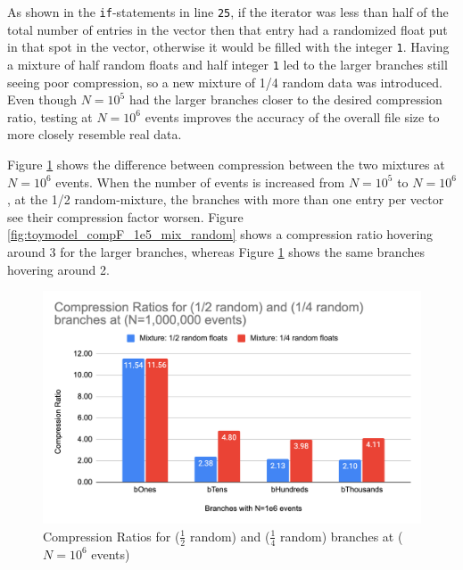 As shown in the \verb|if|-statements in line \verb|25|, if the iterator was less than half of the total number of entries in the vector then that entry had a randomized float put in that spot in the vector, otherwise it would be filled with the integer \verb|1|.
Having a mixture of half random floats and half integer \verb|1| led to the larger branches still seeing poor compression, so a new mixture of 1/4 random data was introduced. 
Even though $N=10^5$ had the larger branches closer to the desired compression ratio, testing at $N=10^6$ events improves the accuracy of the overall file size to more closely resemble real data.

Figure \ref{fig:toymodel_compF_1e6_mix_random} shows the difference between compression between the two mixtures at $N=10^6$ events. 
When the number of events is increased from $N=10^5$ to $N=10^6$, at the 1/2 random-mixture, the branches with more than one entry per vector see their compression factor worsen. 
Figure \ref{fig:toymodel_compF_1e5_mix_random} shows a compression ratio hovering around 3 for the larger branches, whereas Figure \ref{fig:toymodel_compF_1e6_mix_random} shows the same branches hovering around 2. 

\begin{figure}[h]
    \centering
    \vspace{20px}
    \includegraphics[width=.8\textwidth]{content/toymodel_content/Compression Ratios for (1_2 random) and (1_4 random) branches at (N=1,000,000 events).png}
    \caption{Compression Ratios for ($\frac{1}{2}$ random) and ($\frac{1}{4}$ random) branches at ($N=10^6$ events)}
    \vspace{20px}
    \label{fig:toymodel_compF_1e6_mix_random}
\end{figure}

